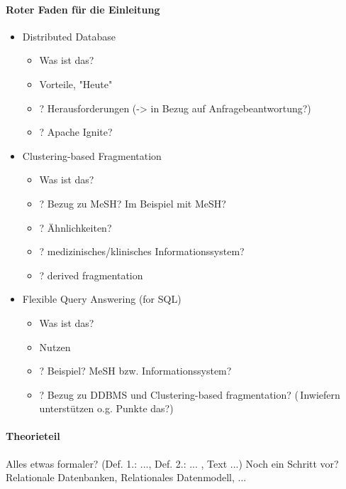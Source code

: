 \paragraph{Roter Faden für die Einleitung}

\begin{itemize}
    \item Distributed Database
    \begin{itemize}
        \item Was ist das?
        \item Vorteile, "Heute"
        \item ? Herausforderungen (-> in Bezug auf Anfragebeantwortung?)
        \item ? Apache Ignite?
    \end{itemize}
    
    \item Clustering-based Fragmentation
    \begin{itemize}
        \item Was ist das?
        \item ? Bezug zu MeSH? Im Beispiel mit MeSH?
        \item ? Ähnlichkeiten?
        \item ? medizinisches/klinisches Informationssystem?
        \item ? derived fragmentation
    \end{itemize}
    
    \item Flexible Query Answering (for SQL)
    \begin{itemize}
        \item Was ist das?
        \item Nutzen
        \item ? Beispiel? MeSH bzw. Informationssystem?
        \item ? Bezug zu DDBMS und Clustering-based fragmentation?\newline
                (\textrightarrow\,Inwiefern unterstützen o.g. Punkte das?)
    \end{itemize}
\end{itemize}



\paragraph{Theorieteil}

Alles etwas formaler? (Def. 1.: ..., Def. 2.: ... , Text ...)
Noch ein Schritt vor? Relationale Datenbanken, Relationales Datenmodell, ...

